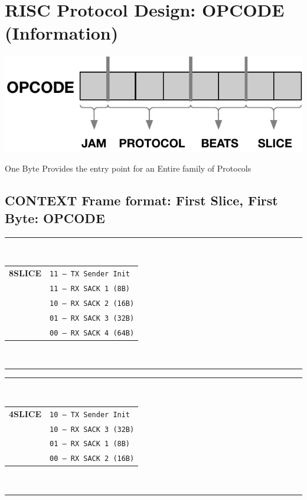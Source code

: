 \documentclass[../OAE-SPEC-MAIN.tex]{subfiles}
\begin{document}
\clearpage
\section{RISC Protocol Design: OPCODE (Information)}\label{sec:opcode-information}

\begin{marginfigure}
 \centering
  \includegraphics[width=1.1\linewidth]{./figures/opcode.pdf}
\caption{\centering One Byte Provides the entry point for  an Entire family of  Protocols}
\end{marginfigure}

\subsection{CONTEXT Frame format: First Slice, First Byte: OPCODE}

\begin{margintable}
  \footnotesize
  \rule{5.4cm}{0.8pt}\\
  \begin{tabular}{@{}cl@{}}
    \textbf{8SLICE} & \texttt{11 — TX Sender Init} \\
                   & \texttt{11 — RX SACK 1 (8B)} \\
                   & \texttt{10 — RX SACK 2 (16B)} \\
                   & \texttt{01 — RX SACK 3 (32B)} \\
                   & \texttt{00 — RX SACK 4 (64B)} \\
  \end{tabular}\\
  \rule{5.4cm}{0.6pt}
\end{margintable}

\begin{margintable}
  \footnotesize
  \rule{5.4cm}{0.8pt}\\
  \begin{tabular}{@{}cl@{}}
    \textbf{4SLICE} & \texttt{10 — TX Sender Init} \\
                      & \texttt{10 — RX SACK 3 (32B)} \\
                   & \texttt{01 — RX SACK 1 (8B)} \\
                   & \texttt{00 — RX SACK 2 (16B)} \\
  \end{tabular}\\
  \rule{5.4cm}{0.6pt}
\end{margintable}
\end{document}
